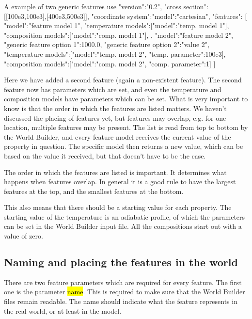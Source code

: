 \documentclass{book}
\newcommand{\WB}{{World Builder}}
\begin{document}
\begin{javascriptcode}{A example of two generic features use}{}
{
  "version":"0.2",
  "cross section":[[100e3,100e3],[400e3,500e3]],
  "coordinate system":{"model":"cartesian"},
  "features":
  [
    {
      "model":"feature model 1",
      "temperature models":[{"model":"temp. model 1"}],
      "composition models":[{"model":"comp. model 1"}],
    },
    {
      "model":"feature model 2",
      "generic feature option 1":1000.0,
      "generic feature option 2":"value 2",
      "temperature models":[{"model":"temp. model 2", "temp. parameter":100e3}],
      "composition models":[{"model":"comp. model 2", "comp. parameter":1}]
    }
  ]
}
\end{javascriptcode}

Here we have added a second feature (again a non-existent feature). The second feature now has parameters which are set, and even the temperature and composition models have parameters which can be set. What is very important to know is that the order in which the features are listed matters. We haven't discussed the placing of features yet, but features may overlap, e.g. for one location, multiple features may be present. The list is read from top to bottom by the \WB{}, and every feature model receives the current value of the property in question. The specific model then returns a new value, which can be based on the value it received, but that doesn't have to be the case. 

\begin{remark}
The order in which the features are listed is important. It determines what happens when features overlap. In general it is a good rule to have the largest features at the top, and the smallest features at the bottom.
\end{remark}

This also means that there should be a starting value for each property. The starting value of the temperature is an adiabatic profile, of which the parameters can be set in the \WB{} input file. All the compositions start out with a value of zero.

\subsection{Naming and placing the features in the world}
There are two feature parameters which are required for every feature. The first one is the parameter \hl{name}. This is required to make sure that the \WB{} files remain readable. The name should indicate what the feature represents in the real world, or at least in the model. 
\end{document}
